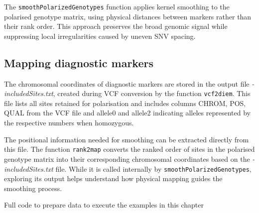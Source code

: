 \documentclass[
]{book}
\newenvironment{Shaded}{\begin{snugshade}}{\end{snugshade}}
\newcommand{\AttributeTok}[1]{\textcolor[rgb]{0.13,0.29,0.53}{#1}}
\newcommand{\ConstantTok}[1]{\textcolor[rgb]{0.56,0.35,0.01}{#1}}
\newcommand{\DecValTok}[1]{\textcolor[rgb]{0.00,0.00,0.81}{#1}}
\newcommand{\FunctionTok}[1]{\textcolor[rgb]{0.13,0.29,0.53}{\textbf{#1}}}
\newcommand{\NormalTok}[1]{#1}
\newcommand{\OtherTok}[1]{\textcolor[rgb]{0.56,0.35,0.01}{#1}}
\newcommand{\SpecialCharTok}[1]{\textcolor[rgb]{0.81,0.36,0.00}{\textbf{#1}}}
\newcommand{\StringTok}[1]{\textcolor[rgb]{0.31,0.60,0.02}{#1}}
\begin{document}
The \texttt{smoothPolarizedGenotypes} function applies kernel smoothing to the polarised genotype matrix, using physical distances between markers rather than their rank order. This approach preserves the broad genomic signal while suppressing local irregularities caused by uneven SNV spacing.

\subsection{Mapping diagnostic markers}\label{mapping-diagnostic-markers}

The chromosomal coordinates of diagnostic markers are stored in the output file \emph{-includedSites.txt}, created during VCF conversion by the function \texttt{vcf2diem}. This file lists all sites retained for polarisation and includes columns CHROM, POS, QUAL from the VCF file and allele0 and allele2 indicating alleles represented by the respective numbers when homozygous.

The positional information needed for smoothing can be extracted directly from this file. The function \texttt{rank2map} converts the ranked order of sites in the polarised genotype matrix into their corresponding chromosomal coordinates based on the \emph{-includedSites.txt} file. While it is called internally by \texttt{smoothPolarizedGenotypes}, exploring its output helps understand how physical mapping guides the smoothing process.

Full code to prepare data to execute the examples in this chapter

\begin{Shaded}
\end{Shaded}
\end{document}
